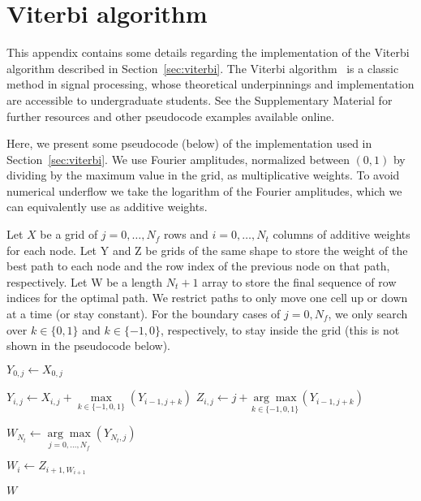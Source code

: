 \documentclass[paper-main.tex]{subfiles}
\begin{document}
\section{Viterbi algorithm}
\label{app:viterbi}
This appendix contains some details regarding the implementation of the Viterbi algorithm described in Section~\ref{sec:viterbi}. 
The Viterbi algorithm~\cite{Viterbi:1967} is a classic method in signal processing, whose theoretical underpinnings and implementation are accessible to undergraduate students. 
See the Supplementary Material for further resources and other pseudocode examples available online.

Here, we present some pseudocode (below) of the implementation used in Section~\ref{sec:viterbi}. We use Fourier amplitudes, normalized between $(0, 1)$ by dividing by the maximum value in the grid, as multiplicative weights. 
To avoid numerical underflow we take the logarithm of the Fourier amplitudes, which we can equivalently use as additive weights.


Let $X$ be a grid of $j=0,\ldots,N_f$ rows and $i=0,\ldots,N_t$ columns of additive weights for each node. Let Y and Z be grids of the same shape to store the weight of the best path to each node and the row index of the previous node on that path, respectively. Let W be a length $N_t+1$ array to store the final sequence of row indices for the optimal path. We restrict paths to only move one cell up or down at a time (or stay constant). For the boundary cases of $j=0,N_f$, we only search over $k \in \{0,1\}$ and $k \in \{-1,0\}$, respectively, to stay inside the grid (this is not shown in the pseudocode below).

\begin{algorithmic}

		\State $Y_{0,j} \gets X_{0,j}$
    \EndFor

		
	    	\State $Y_{i,j} \gets X_{i,j} + \underset{k \in \{-1,0,1\}}{\max} (Y_{i-1,j+k})$
	    	\State $Z_{i,j} \gets j + \underset{k \in \{-1,0,1\}}{\arg\max} (Y_{i-1,j+k})$
   
	    \EndFor
    \EndFor

    \State $W_{N_t} \gets \underset{j=0,\ldots,N_f}{\arg\max} (Y_{N_t,j})$


		\State $W_i \gets Z_{i+1, W_{i+1}}$

    \EndFor    

    \State \Return $W$
\EndFunction
\end{algorithmic}
\end{document}

